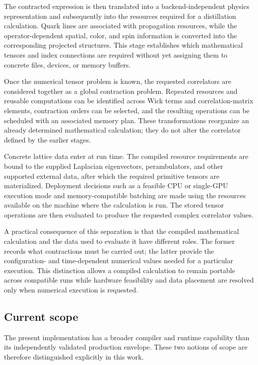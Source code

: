 \documentclass[11pt]{article}
\begin{document}
The contracted expression is then translated into a backend-independent
physics representation and subsequently into the resources required for a
distillation calculation. Quark lines are associated with propagation
resources, while the operator-dependent spatial, color, and spin information is
converted into the corresponding projected structures. This stage establishes
which mathematical tensors and index connections are required without yet
assigning them to concrete files, devices, or memory buffers.

Once the numerical tensor problem is known, the requested correlators are
considered together as a global contraction problem. Repeated resources and
reusable computations can be identified across Wick terms and correlation-matrix
elements, contraction orders can be selected, and the resulting operations can
be scheduled with an associated memory plan. These transformations reorganize
an already determined mathematical calculation; they do not alter the
correlator defined by the earlier stages.

Concrete lattice data enter at run time. The compiled resource requirements are
bound to the supplied Laplacian eigenvectors, perambulators, and other supported
external data, after which the required primitive tensors are materialized.
Deployment decisions such as a feasible CPU or single-GPU execution mode and
memory-compatible batching are made using the resources available on the
machine where the calculation is run. The stored tensor operations are then
evaluated to produce the requested complex correlator values.

A practical consequence of this separation is that the compiled mathematical
calculation and the data used to evaluate it have different roles. The former
records what contractions must be carried out; the latter provide the
configuration- and time-dependent numerical values needed for a particular
execution. This distinction allows a compiled calculation to remain portable
across compatible runs while hardware feasibility and data placement are
resolved only when numerical execution is requested.

\subsection{Current scope}

The present implementation has a broader compiler and runtime capability than
its independently validated production envelope. These two notions of scope
are therefore distinguished explicitly in this work.
\end{document}
